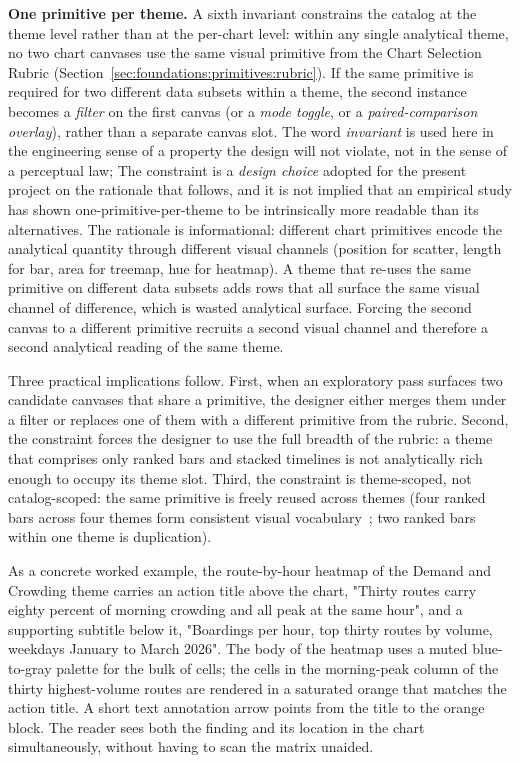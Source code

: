 \noindent\textbf{One primitive per theme.} A sixth invariant constrains the catalog at the theme level rather
than at the per-chart level: within any single analytical theme, no two
chart canvases use the same visual primitive from the Chart Selection
Rubric (Section~\ref{sec:foundations:primitives:rubric}). If the same primitive is required
for two different data subsets within a theme, the second instance
becomes a \emph{filter} on the first canvas (or a \emph{mode toggle},
or a \emph{paired-comparison overlay}), rather than a separate canvas
slot. The word \textit{invariant} is used here in the engineering
sense of a property the design will not violate, not in the sense of a
perceptual law; The constraint is a \textit{design choice} adopted for the
present project on the rationale that follows, and it is not implied
that an empirical study has shown one-primitive-per-theme to be
intrinsically more readable than its alternatives. The rationale is
informational: different chart primitives encode the analytical
quantity through different visual channels (position for scatter,
length for bar, area for treemap, hue for heatmap). A theme that
re-uses the same primitive on different data subsets adds rows that
all surface the same visual channel of difference, which is wasted
analytical surface. Forcing the second canvas to a different primitive
recruits a second visual channel and therefore a second analytical
reading of the same theme.

Three practical implications follow. First, when an exploratory pass
surfaces two candidate canvases that share a primitive, the designer
either merges them under a filter or replaces one of them with a
different primitive from the rubric. Second, the constraint forces the
designer to use the full breadth of the rubric: a theme that comprises
only ranked bars and stacked timelines is not analytically rich enough
to occupy its theme slot. Third, the constraint is theme-scoped, not
catalog-scoped: the same primitive is freely reused across themes
(four ranked bars across four themes form consistent visual
vocabulary~\cite{liu2022}; two ranked bars within one theme is
duplication).

As a concrete worked example, the route-by-hour heatmap of the Demand
and Crowding theme carries an action title above the chart, "Thirty
routes carry eighty percent of morning crowding and all peak at the
same hour", and a supporting subtitle below it, "Boardings per hour,
top thirty routes by volume, weekdays January to March 2026". The body
of the heatmap uses a muted blue-to-gray palette for the bulk of cells;
the cells in the morning-peak column of the thirty highest-volume
routes are rendered in a saturated orange that matches the action
title. A short text annotation arrow points from the title to the
orange block. The reader sees both the finding and its location in the
chart simultaneously, without having to scan the matrix unaided.

